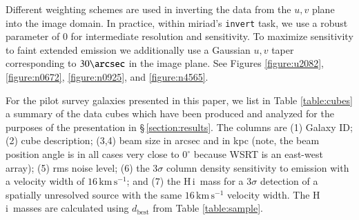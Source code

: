 \documentclass[oldversion]{aa}
\newcommand{\HI}{{\sc H\,i}}
\begin{document}
Different weighting schemes are used in inverting the data from the $u,v$ plane into the image domain. In practice, within miriad's {\tt invert} task, we use a robust parameter of $0$ for intermediate resolution and sensitivity. To maximize sensitivity to faint extended emission we additionally use a Gaussian $u,v$ taper corresponding to $30\arcsec$ in the image plane. See Figures \ref{figure:u2082}, \ref{figure:n0672}, \ref{figure:n0925}, and \ref{figure:n4565}.

For the pilot survey galaxies presented in this paper, we list in Table \ref{table:cubes} a summary of the data cubes which have been produced and analyzed for the purposes of the presentation in \S\,\ref{section:results}. The columns are (1) Galaxy ID; (2) cube description; (3,4) beam size in arcsec and in kpc (note, the beam position angle is in all cases very close to $0^\circ$ because WSRT is an east-west array); (5) rms noise level; (6) the $3\sigma$ column density sensitivity to emission with a velocity width of $16\,\mathrm{km\,s^{-1}}$; and (7) the \HI\ mass for a $3\sigma$ detection of a spatially unresolved source with the same $16\,\mathrm{km\,s^{-1}}$ velocity width. The \HI\ masses are calculated using $d_\mathrm{best}$ from Table \ref{table:sample}.
\end{document}
